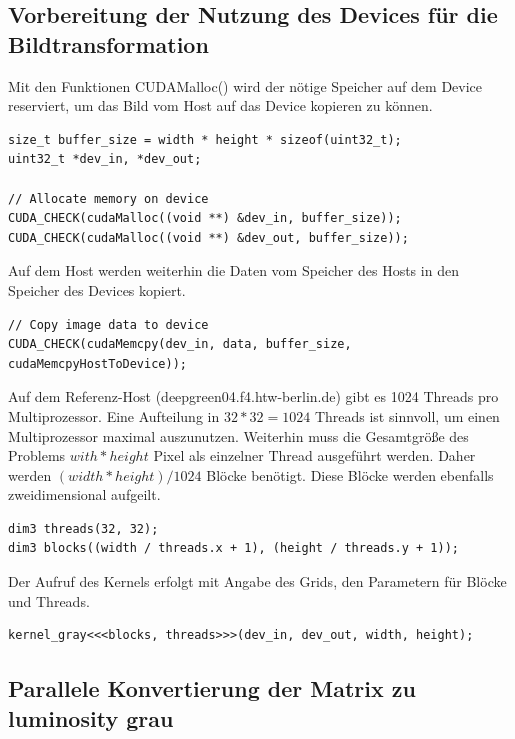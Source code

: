 \documentclass{llncs}
\begin{document}
\subsection{Vorbereitung der Nutzung des Devices für die Bildtransformation}
%

Mit den Funktionen CUDAMalloc() wird der nötige Speicher auf dem Device reserviert, um das Bild vom Host auf das Device kopieren zu können.

\begin{lstlisting}
size_t buffer_size = width * height * sizeof(uint32_t);
uint32_t *dev_in, *dev_out;

// Allocate memory on device
CUDA_CHECK(cudaMalloc((void **) &dev_in, buffer_size));
CUDA_CHECK(cudaMalloc((void **) &dev_out, buffer_size));
\end{lstlisting}

Auf dem Host werden weiterhin die Daten vom Speicher des Hosts in den Speicher des Devices kopiert.\\

\begin{lstlisting}[]
// Copy image data to device
CUDA_CHECK(cudaMemcpy(dev_in, data, buffer_size, cudaMemcpyHostToDevice));
\end{lstlisting}

Auf dem Referenz-Host (deepgreen04.f4.htw-berlin.de) gibt es 1024 Threads pro Multiprozessor. Eine Aufteilung in $32 * 32 = 1024$ Threads ist sinnvoll, um einen Multiprozessor maximal auszunutzen. Weiterhin muss die Gesamtgröße des Problems $with * height$ Pixel als einzelner Thread ausgeführt werden. Daher werden $(width * height) / 1024$ Blöcke benötigt. Diese Blöcke werden ebenfalls zweidimensional aufgeilt.

\begin{lstlisting}
dim3 threads(32, 32);
dim3 blocks((width / threads.x + 1), (height / threads.y + 1));
\end{lstlisting}

Der Aufruf des Kernels erfolgt mit Angabe des Grids, den Parametern für Blöcke und Threads.

\begin{lstlisting}
kernel_gray<<<blocks, threads>>>(dev_in, dev_out, width, height);
\end{lstlisting}


%
\subsection{Parallele Konvertierung der Matrix zu luminosity grau}
%
\end{document}
